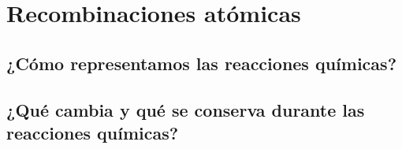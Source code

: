 \thispagestyle{plain}
\section{Recombinaciones atómicas}
\subsection{¿Cómo representamos las reacciones qu\'imicas?}
\subsection{¿Qué cambia y qué se conserva durante las reacciones químicas?}

\newpage